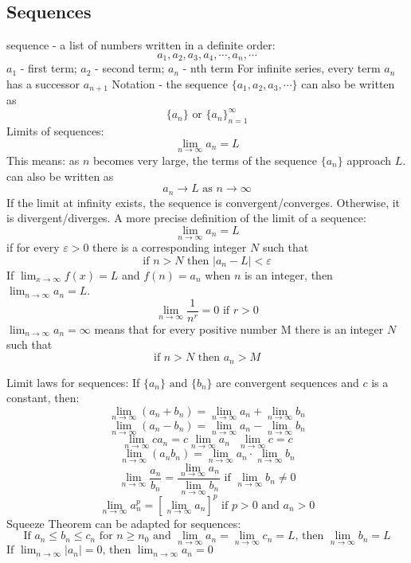 \documentclass{article}
\begin{document}
    \subsection{Sequences} %
    \begin{outline}
        \1 sequence - a list of numbers written in a definite order: \[a_1, a_2, a_3, a_4, \cdots, a_n, \cdots \]
        \1 $a_1$ - first term; $a_2$ - second term; $a_n$ - nth term 
        \1 For infinite series, every term $a_n$ has a successor $a_{n+1}$
        \1 Notation - the sequence \(\{a_1, a_2, a_3, \cdots\}\) can also be written as \[\{a_n\}\text{ or }\{a_n\}^\infty_{n=1}\] 
        \1 Limits of sequences: \[\lim_{n\to\infty}a_n=L\]
            \2 This means: as $n$ becomes very large, the terms of the sequence $\{a_n\}$ approach $L$. 
        \1 can also be written as \[a_n\to L \text{ as } n\to\infty\]
        \1 If the limit at infinity exists, the sequence is convergent/converges. Otherwise, it is divergent/diverges. 
        \1 A more precise definition of the limit of a sequence: \[\lim_{n\to\infty}a_n=L\] if for every \(\varepsilon>0\) there is a corresponding integer $N$ such that \[\text{if }n>N\text{ then }|a_n-L|<\varepsilon\]
        \1 If \(\lim_{x\to\infty}f(x)=L\) and \(f(n)=a_n\) when $n$ is an integer, then \(\lim_{n\to\infty}a_n=L\). 
        \1 \[\lim_{n\to\infty}\dfrac{1}{n^r}=0\text{    if }r>0\]
        \1 \(\lim_{n\to\infty}a_n=\infty\) means that for every positive number M there is an integer $N$ such that \[\text{if }n>N\text{ then }a_n>M\]
    \end{outline}
    \begin{outline}
        \1 Limit laws for sequences: If \(\{a_n\}\text{ and }\{b_n\}\) are convergent sequences and $c$ is a constant, then: \[\lim_{n\to\infty}(a_n+b_n)=\lim_{n\to\infty}a_n+\lim_{n\to\infty}b_n\]\[\lim_{n\to\infty}(a_n-b_n)=\lim_{n\to\infty}a_n-\lim_{n\to\infty}b_n\]\[\lim_{n\to\infty}ca_n=c\lim_{n\to\infty}a_n\text{    }\lim_{n\to\infty}c=c\]\[\lim_{n\to\infty}(a_nb_n)=\lim_{n\to\infty}a_n\cdot\lim_{n\to\infty}b_n\]\[\lim_{n\to\infty}\dfrac{a_n}{b_n}=\dfrac{\lim_{n\to\infty}a_n}{\lim_{n\to\infty}b_n}\text{ if }\lim_{n\to\infty}b_n\neq0\]\[\lim_{n\to\infty}a_n^p=\left[\lim_{n\to\infty}a_n\right]^p\text{ if }p>0\text{ and }a_n>0\]
        \1 Squeeze Theorem can be adapted for sequences: \[\text{If }a_n\leq b_n\leq c_n\text{ for }n\geq n_0\text{ and }\lim_{n\to\infty}a_n=\lim_{n\to\infty}c_n=L\text{, then }\lim_{n\to\infty}b_n=L\]
        \1 \(\text{If }\lim_{n\to\infty}|a_n|=0\text{, then }\lim_{n\to\infty}a_n=0\)
    \end{outline}
\end{document}
